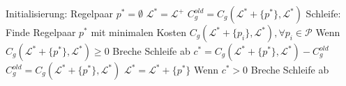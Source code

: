 \begin{algorithm}[caption={Generalisieren eines L-Systems mit Gewichtung $w_0$}]
    Initialisierung:
        Regelpaar $p^* = \emptyset$
        $\mathcal{L}^* = \mathcal{L}^+$
        $C_g^{old} = C_g(\mathcal{L}^* + \{p^*\}, \mathcal{L}^*)$
    Schleife:
        Finde Regelpaar $p^*$ mit minimalen Kosten $C_g(\mathcal{L}^* + \{p_i\}, \mathcal{L}^*), \forall p_i \in \mathcal{P}$
        Wenn $C_g(\mathcal{L}^* + \{p^*\}, \mathcal{L}^*) \geq 0$
            Breche Schleife ab
        $c^* = C_g(\mathcal{L}^* + \{p^*\}, \mathcal{L}^*) - C_g^{old}$
        $C_g^{old} = C_g(\mathcal{L}^* + \{p^*\}, \mathcal{L}^*)$
        $\mathcal{L}^* = \mathcal{L}^* + \{p^*\}$
        Wenn $c^* > 0$
            Breche Schleife ab
\end{algorithm}

